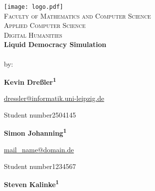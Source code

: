 \begin{titlepage}	%
	\begin{center}
		\libertineOsF
		\vspace*{0.1cm}
		\texttt{[image: logo.pdf]}\\[0.75cm]
		\normalsize{\textsc{Faculty of Mathematics and Computer Science\\Applied Computer Science\\Digital Humanities}}\\[1.25cm]
		\huge{\textbf{Liquid Democracy Simulation}}\\[0.75cm]
		\normalsize{\\[1cm]
			by:}
		
	\vspace*{\fill} 
	\begin{minipage}[t]{.6\textwidth}
		\large{\textbf{Kevin Dreßler\textsuperscript{1}}} \vspace*{0.3cm}
		
		\begin{normalsize}
			\href{mailto:dressler@informatik.uni-leipzig.de}{dressler@informatik.uni-leipzig.de} %
			
			\libertineLF
			{\footnotesize Student number\enspace{}2504145} \vspace*{1cm}
		\end{normalsize}
	\end{minipage}%
	\begin{minipage}[t]{.4\textwidth}
		\large{\textbf{Simon Johanning\textsuperscript{1}}} \vspace*{0.3cm}
		
		\begin{normalsize}
			\href{mailto:mail_name@domain.de}{mail\_name@domain.de} %
			
			\libertineLF
			{\footnotesize Student number\enspace{}1234567} \vspace*{1cm}
		\end{normalsize}
	\end{minipage}
		\begin{minipage}[t]{.6\textwidth}
		\large{\textbf{Steven Kalinke\textsuperscript{1}}} \vspace*{0.3cm}
		

\end{minipage}
\end{center}
\end{titlepage}
